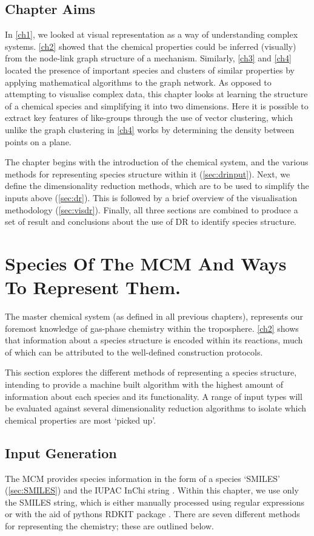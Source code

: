 \subsection*{Chapter Aims}
In \autoref{ch1}, we looked at visual representation as a way of understanding complex systems. \autoref{ch2} showed that the chemical properties could be inferred (visually) from the node-link graph structure of a mechanism. Similarly, \autoref{ch3} and \autoref{ch4} located the presence of important species and clusters of similar properties by applying mathematical algorithms to the graph network. As opposed to attempting to visualise complex data, this chapter looks at learning the structure of a chemical species and simplifying it into two dimensions. Here it is possible to extract key features of like-groups through the use of vector clustering, which unlike the graph clustering in \autoref{ch4} works by determining the density between points on a plane.

The chapter begins with the introduction of the chemical system, and the various methods for representing species structure within it (\autoref{sec:drinput}). Next, we define the dimensionality reduction methods, which are to be used to simplify the inputs above (\autoref{sec:dr}). This is followed by a brief overview of the visualisation methodology (\autoref{sec:visdr}). Finally, all three sections are combined to produce a set of result and conclusions about the use of DR to identify species structure.



\section{Species Of The MCM And Ways To Represent Them.}\label{sec:drinput}
The master chemical system (as defined in all previous chapters), represents our foremost knowledge of gas-phase chemistry within the troposphere.  \autoref{ch2} shows that information about a species structure is encoded within its reactions, much of which can be attributed to the well-defined construction protocols.

This section explores the different methods of representing a species structure, intending to provide a machine built algorithm with the highest amount of information about each species and its functionality. A range of input types will be evaluated against several dimensionality reduction algorithms to isolate which chemical properties are most `picked up'.

\subsection{Input Generation}
The MCM provides species information in the form of a species `SMILES' (\autoref{sec:SMILES}) and the IUPAC InChi string \citep{inchi}. Within this chapter, we use only the SMILES string, which is either manually processed using regular expressions or with the aid of pythons RDKIT package \citep{rdkit}. There are seven different methods for representing the chemistry; these are outlined below.


